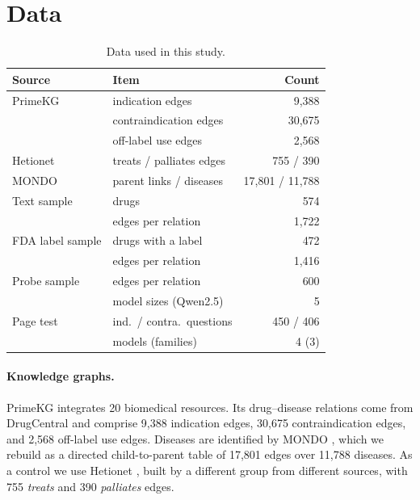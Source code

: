 \documentclass[letterpaper]{article} %
\begin{document}
\section{Data}

\begin{table}[t]
\centering
\small
\setlength{\tabcolsep}{4pt}
\begin{tabular}{llr}
\toprule
Source & Item & Count \\
\midrule
PrimeKG & indication edges & 9,388 \\
 & contraindication edges & 30,675 \\
 & off-label use edges & 2,568 \\
Hetionet & treats / palliates edges & 755 / 390 \\
MONDO & parent links / diseases & 17,801 / 11,788 \\
\midrule
Text sample & drugs & 574 \\
 & edges per relation & 1,722 \\
FDA label sample & drugs with a label & 472 \\
 & edges per relation & 1,416 \\
Probe sample & edges per relation & 600 \\
 & model sizes (Qwen2.5) & 5 \\
Page test & ind.\ / contra.\ questions & 450 / 406 \\
 & models (families) & 4 (3) \\
\bottomrule
\end{tabular}
\caption{Data used in this study.}
\label{tab:data}
\end{table}

\paragraph{Knowledge graphs.}
PrimeKG \citep{chandak2023primekg} integrates 20 biomedical resources. Its
drug--disease relations come from DrugCentral and comprise 9,388 indication
edges, 30,675 contraindication edges, and 2,568 off-label use edges. Diseases
are identified by MONDO \citep{vasilevsky2022mondo}, which we rebuild as a
directed child-to-parent table of 17,801 edges over 11,788 diseases. As a
control we use Hetionet \citep{himmelstein2017hetionet}, built by a different
group from different sources, with 755 \emph{treats} and 390 \emph{palliates}
edges.
\end{document}
